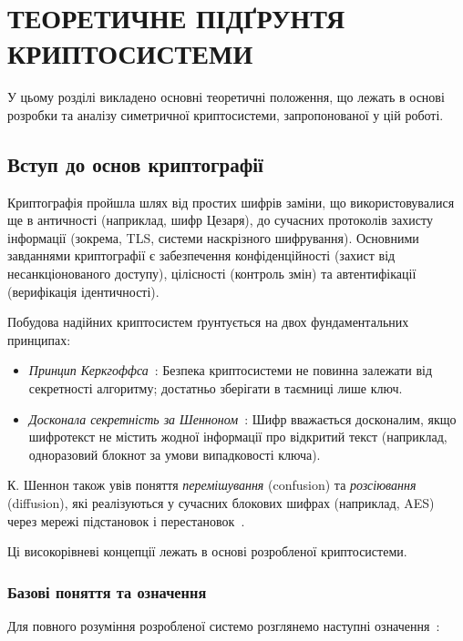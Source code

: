 \chapter{ТЕОРЕТИЧНЕ ПІДҐРУНТЯ КРИПТОСИСТЕМИ}\label{ch:-1:---}

У цьому розділі викладено основні теоретичні положення, що лежать в основі розробки та аналізу симетричної криптосистеми, запропонованої у цій роботі.


\section{Вступ до основ криптографії}
\label{sec:crypto_intro}

Криптографія пройшла шлях від простих шифрів заміни, що використовувалися ще в античності (наприклад, шифр Цезаря),
до сучасних протоколів захисту інформації (зокрема, TLS, системи наскрізного шифрування).
Основними завданнями криптографії є забезпечення конфіденційності (захист від несанкціонованого доступу),
цілісності (контроль змін) та автентифікації (верифікація ідентичності).

Побудова надійних криптосистем ґрунтується на двох фундаментальних принципах:
\begin{itemize}
    \item \emph{Принцип Керкгоффса}~\cite{Kerckhoffs83}: Безпека криптосистеми не повинна залежати від секретності алгоритму;
    достатньо зберігати в таємниці лише ключ.
    \item \emph{Досконала секретність за Шенноном}~\cite{Shannon49}: Шифр вважається досконалим, якщо шифротекст не містить жодної
    інформації про відкритий текст (наприклад, одноразовий блокнот за умови випадковості ключа).
\end{itemize}

К. Шеннон також увів поняття \emph{перемішування} (confusion) та \emph{розсіювання} (diffusion), які реалізуються у сучасних
блокових шифрах (наприклад, AES) через мережі підстановок і перестановок~\cite{Shannon49}.

Ці високорівневі концепції лежать в основі розробленої криптосистеми.

\subsection{Базові поняття та означення}
\label{subsec:crypto_basics}

Для повного розуміння розробленої системо розглянемо наступні означення~\cite{Mao04,BerczesEtAl14}:

